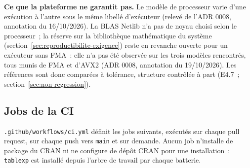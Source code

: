 \documentclass[a4paper,11pt]{article}
\newcommand{\code}[1]{\texttt{\small #1}}
\begin{document}
\begin{encadre}
\small
\textbf{Ce que la plateforme ne garantit pas.} Le modèle de processeur varie
d'une exécution à l'autre sous le même libellé d'exécuteur (relevé de l'ADR
0008, annotation du 16/10/2026). La BLAS Netlib n'a pas de noyau choisi selon
le processeur~; la réserve sur la bibliothèque mathématique du système
(section~\ref{sec:reproductibilite-exigence}) reste en revanche ouverte pour
un exécuteur sans FMA~: elle n'a pas été observée sur les trois modèles
rencontrés, tous munis de FMA et d'AVX2 (ADR 0008, annotation du
19/10/2026). Les références sont donc comparées à tolérance, structure contrôlée
à part (E4.7~; section~\ref{sec:non-regression}).
\end{encadre}

\subsection{Jobs de la CI}
\label{sec:jobs-ci}

\code{.github/workflows/ci.yml} définit les jobs suivants, exécutés sur chaque
pull request, sur chaque push vers \code{main} et sur demande. Aucun job n'installe de
package du CRAN ni ne configure de dépôt CRAN pour une installation~:
\code{tablexp} est installé depuis l'arbre de travail par chaque batterie.
\end{document}

